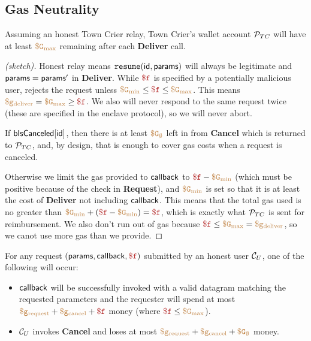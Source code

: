 \subsection{Gas Neutrality}


\begin{theorem}
Assuming an honest Town Crier relay,
Town Crier's wallet account ${\cal P}_{TC}$ will have at least $\tt {\color{brown} \$G_\text{max} }$ remaining after each {\bf Deliver} call.
\end{theorem}

\begin{proof}[(sketch)]
Honest relay means $\texttt{resume}({\sf id}, {\sf params})$ will always be legitimate and ${\sf params} = {\sf params}'$ in {\bf Deliver}.
While $\fee$ is specified by a potentially malicious user, \tcont rejects the request unless $\constgasmin \leq \fee \leq \constgasmax$.
This means $\gasdeliver = \constgasmax \geq \fee$.
We also will never respond to the same request twice (these are specified in the enclave protocol), so we will never abort.

If ${\sf bIsCanceled}[{\sf id}]$, then there is at least $\tt {\color{brown} \$G_\emptyset }$ left in \tcont from {\bf Cancel} which is returned to ${\cal P}_{TC}$,
and, by design, that is enough to cover gas costs when a request is canceled.

Otherwise we limit the gas provided to ${\sf callback}$ to $\fee - \constgasmin$ (which must be positive because of the check in {\bf Request}),
and $\tt {\color{brown} \$G_\text{min} }$ is set so that it is at least the cost of {\bf Deliver} not including ${\sf callback}$.
This means that the total gas used is no greater than $\constgasmin + (\fee - \constgasmin) = \fee$, which is exactly what ${\cal P}_{TC}$ is sent for reimbursement.
We also don't run out of gas because $\fee \leq \constgasmax = \gasdeliver$, so we canot use more gas than we provide.
\end{proof}


\begin{theorem}
For any request $(\dgform, \dgcallback, \fee)$ submitted by an honest user ${\cal C}_U$, one of the following will occur:
\begin{itemize}
  \item ${\sf callback}$ will be successfully invoked with a valid datagram matching the requested parameters and the requester will spend at most $\gasrequest + \gascancel + \fee$ money (where $\fee \leq \constgasmax$).

  \item ${\cal C}_U$ invokes {\bf Cancel} and loses at most $\tt {\color{brown} \$g_\text{request} } + \tt {\color{brown} \$g_\text{cancel} } + \tt {\color{brown} \$G_\emptyset }$ money.
\end{itemize}
\end{theorem}

